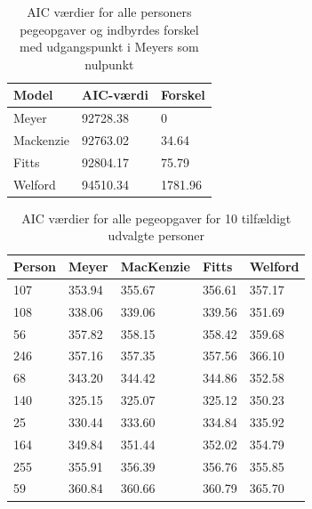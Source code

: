 \begin{table}[h]
\centering
\begin{tabular}{lll}
Model 	  & AIC-værdi & Forskel\\\hline
Meyer 	  & 92728.38 & 0 \\
Mackenzie & 92763.02 & 34.64 \\
Fitts 	  & 92804.17 & 75.79 \\
Welford   & 94510.34 & 1781.96
\end{tabular}
\caption{AIC værdier for alle personers pegeopgaver og indbyrdes forskel med udgangspunkt i Meyers som nulpunkt}
\label{tab:table_analysis_aic1}
\end{table}

\begin{table}[h]
\centering
\begin{tabular}{lllll}
Person & Meyer  & MacKenzie & Fitts  & Welford \\\hline
107    & 353.94 & 355.67    & 356.61 & 357.17  \\
108    & 338.06 & 339.06    & 339.56 & 351.69  \\
56     & 357.82 & 358.15    & 358.42 & 359.68  \\
246    & 357.16 & 357.35    & 357.56 & 366.10  \\
68     & 343.20 & 344.42    & 344.86 & 352.58  \\
140    & 325.15 & 325.07    & 325.12 & 350.23  \\
25     & 330.44 & 333.60    & 334.84 & 335.92  \\
164    & 349.84 & 351.44    & 352.02 & 354.79  \\
255    & 355.91 & 356.39    & 356.76 & 355.85  \\
59     & 360.84 & 360.66    & 360.79 & 365.70
\end{tabular}
\caption{AIC værdier for alle pegeopgaver for 10 tilfældigt udvalgte personer}
\label{tab:table_analysis_aic2}
\end{table}

